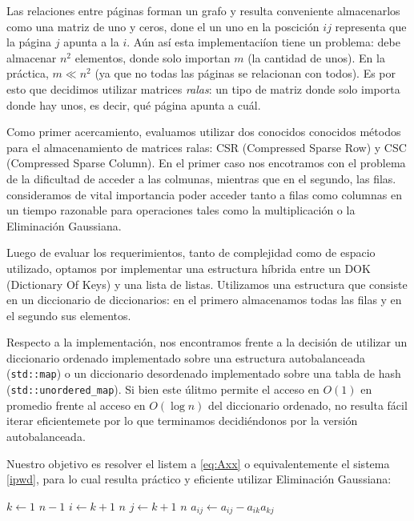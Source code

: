 
\par Las relaciones entre p\'aginas forman un grafo y resulta conveniente almacenarlos como una
matriz de uno y ceros, done el un uno en la poscici\'on $ij$ representa que la p\'agina $j$ apunta a la $i$.
A\'un as\'i esta implementaci\'ion tiene un problema: debe almacenar $n^2$ elementos, donde solo importan
$m$ (la cantidad de unos). En la pr\'actica, $m \ll n^2$ (ya que no todas las p\'aginas se relacionan
con todos). Es por esto que decidimos utilizar matrices \textit{ralas}: un tipo de matriz donde solo
importa donde hay unos, es decir, qu\'e p\'agina apunta a cu\'al.
\par Como primer acercamiento, evaluamos utilizar dos conocidos conocidos m\'etodos para el almacenamiento
de matrices ralas: CSR (Compressed Sparse Row) y CSC (Compressed Sparse Column). En el primer caso
nos encotramos con el problema de la dificultad de acceder a las colmunas, mientras que en el segundo,
las filas. consideramos de vital importancia poder acceder tanto a filas como columnas en un tiempo
razonable para operaciones tales como la multiplicación o la Eliminación Gaussiana.
\par Luego de evaluar los requerimientos, tanto de complejidad como de espacio utilizado, optamos
por implementar una estructura h\'ibrida entre un DOK (Dictionary Of Keys) y una lista de listas. 
Utilizamos una estructura que consiste en un diccionario de diccionarios: en el primero almacenamos
todas las filas y en el segundo sus elementos.
\par Respecto a la implementaci\'on, nos encontramos frente a la decisión de utilizar un diccionario ordenado
implementado sobre una estructura autobalanceada (\verb|std::map|) o un diccionario desordenado
implementado sobre una tabla de hash (\verb|std::unordered_map|). Si bien este \'ulitmo permite
el acceso en $O(1)$ en promedio frente al acceso en $O(\log n)$ del diccionario ordenado, 
no resulta f\'acil iterar eficientemete por lo que terminamos decidi\'endonos por la versi\'on autobalanceada.
\par Nuestro objetivo es resolver el listem a \ref{eq:Axx} o equivalentemente el sistema \ref{ipwd}, para lo cual 
resulta pr\'actico y eficiente utilizar Eliminación Gaussiana:

\begin{codebox}
\li \For $k \gets 1$ \To $n-1$
    \Do
\li     \For $i \gets k+1$ \To $n$
            \Do
\li         \For $j \gets k+1$ \To $n$
                \Do
\li                 $a_{ij} \gets a_{ij} - a_{ik}a_{kj}$
                \End
            \End
        \End
\end{codebox}

